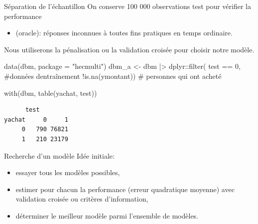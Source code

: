 \documentclass[
  ignorenonframetext,
]{beamer}
\newenvironment{Shaded}{\begin{snugshade}}{\end{snugshade}}
\newcommand{\AttributeTok}[1]{\textcolor[rgb]{0.40,0.45,0.13}{#1}}
\newcommand{\CommentTok}[1]{\textcolor[rgb]{0.37,0.37,0.37}{#1}}
\newcommand{\DecValTok}[1]{\textcolor[rgb]{0.68,0.00,0.00}{#1}}
\newcommand{\FunctionTok}[1]{\textcolor[rgb]{0.28,0.35,0.67}{#1}}
\newcommand{\NormalTok}[1]{\textcolor[rgb]{0.00,0.23,0.31}{#1}}
\newcommand{\OtherTok}[1]{\textcolor[rgb]{0.00,0.23,0.31}{#1}}
\newcommand{\SpecialCharTok}[1]{\textcolor[rgb]{0.37,0.37,0.37}{#1}}
\newcommand{\StringTok}[1]{\textcolor[rgb]{0.13,0.47,0.30}{#1}}
\providecommand{\tightlist}{%
  \setlength{\itemsep}{0pt}\setlength{\parskip}{0pt}}\usepackage{longtable,booktabs,array}
\begin{document}
\begin{frame}[fragile]{Séparation de l'échantillon}
\label{suxe9paration-de-luxe9chantillon}
On conserve 100 000 observations test pour vérifier la performance

\begin{itemize}
\tightlist
\item
  (oracle): réponses inconnues à toutes fins pratiques en temps
  ordinaire.
\end{itemize}

Nous utiliserons la pénalisation ou la validation croisée pour choisir
notre modèle.

\footnotesize

\begin{Shaded}
\begin{Highlighting}[numbers=left,,]
\FunctionTok{data}\NormalTok{(dbm, }\AttributeTok{package =} \StringTok{"hecmulti"}\NormalTok{)}
\NormalTok{dbm\_a }\OtherTok{\textless{}{-}}\NormalTok{ dbm }\SpecialCharTok{|\textgreater{}}
\NormalTok{  dplyr}\SpecialCharTok{::}\FunctionTok{filter}\NormalTok{(}
\NormalTok{    test }\SpecialCharTok{==} \DecValTok{0}\NormalTok{, }\CommentTok{\#données d\textquotesingle{}entraînement}
    \SpecialCharTok{!}\FunctionTok{is.na}\NormalTok{(ymontant)) }\CommentTok{\# personnes qui ont acheté}

\FunctionTok{with}\NormalTok{(dbm, }\FunctionTok{table}\NormalTok{(yachat, test))}
\end{Highlighting}
\end{Shaded}

\begin{verbatim}
      test
yachat     0     1
     0   790 76821
     1   210 23179
\end{verbatim}

\normalsize
\end{frame}

\begin{frame}{Recherche d'un modèle}
\label{recherche-dun-moduxe8le}
Idée initiale:

\begin{itemize}
\tightlist
\item
  essayer tous les modèles possibles,
\item
  estimer pour chacun la performance (erreur quadratique moyenne) avec
  validation croisée ou critères d'information,
\item
  déterminer le meilleur modèle parmi l'ensemble de modèles.
\end{itemize}
\end{frame}
\end{document}
